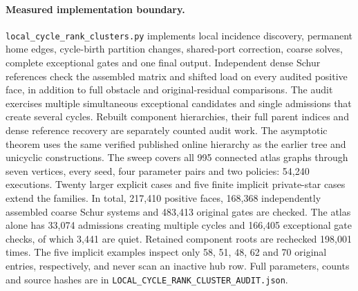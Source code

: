 \paragraph{Measured implementation boundary.}
\texttt{local\_cycle\_rank\_clusters.py} implements local incidence discovery,
permanent home edges, cycle-birth partition changes, shared-port correction,
coarse solves, complete exceptional gates and one final output. Independent
dense Schur references check the assembled matrix and shifted load on every
audited positive face, in addition to full obstacle and original-residual
comparisons. The audit exercises multiple simultaneous exceptional candidates
and single admissions that create several cycles. Rebuilt component
hierarchies, their full parent indices and dense reference recovery are
separately counted audit work. The asymptotic theorem uses the same verified
published online hierarchy as the earlier tree and unicyclic constructions.
The sweep covers all 995 connected atlas graphs through seven vertices,
every seed, four parameter pairs and two policies: 54,240 executions.
Twenty larger explicit cases and five finite implicit private-star cases
extend the families. In total, 217,410 positive faces, 168,368 independently
assembled coarse Schur systems and 483,413 original gates are checked.
The atlas alone has 33,074 admissions creating multiple cycles and 166,405
exceptional gate checks, of which 3,441 are quiet. Retained component roots
are rechecked 198,001 times. The five implicit examples inspect only
58, 51, 48, 62 and 70 original entries, respectively, and never scan an
inactive hub row. Full parameters, counts and source hashes are in
\texttt{LOCAL\_CYCLE\_RANK\_CLUSTER\_AUDIT.json}.
